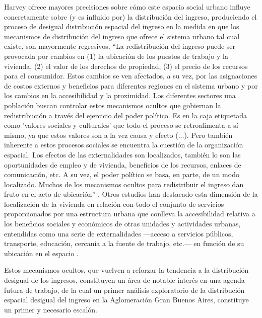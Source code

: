 Harvey ofrece mayores precisiones sobre cómo este espacio social urbano influye concretamente sobre (y es influido por) la distribución del ingreso, produciendo el proceso de desigual distribución espacial del ingreso en la medida en que los mecanismos de distribución del ingreso que ofrece el sistema urbano tal cual existe, son mayormente regresivos. “La redistribución del ingreso puede ser provocada por cambios en (1) la ubicación de los puestos de trabajo y la vivienda, (2) el valor de los derechos de propiedad, (3) el precio de los recursos para el consumidor. Estos cambios se ven afectados, a su vez, por las asignaciones de costos externos y beneficios para diferentes regiones en el sistema urbano y por los cambios en la accesibilidad y la proximidad. Los diferentes sectores una población buscan controlar estos mecanismos ocultos que gobiernan la redistribución a través del ejercicio del poder político. Es en la caja etiquetada como 'valores sociales y culturales' que todo el proceso se retroalimenta a sí mismo, ya que estos valores son a la vez causa y efecto (...). Pero también inherente a estos procesos sociales se encuentra la cuestión de la organización espacial. Los efectos de las externalidades son localizados, también lo son las oportunidades de empleo y de vivienda, beneficios de los recursos, enlaces de comunicación, etc. A su vez, el poder político se basa, en parte, de un modo localizado. Muchos de los mecanismos ocultos para redistribuir el ingreso dan fruto en el acto de ubicación” \cite[p.~86]{harvey}. Otros estudios han destacado esta dimensión de la localización de la vivienda en relación con todo el conjunto de servicios proporcionados por una estructura urbana que conlleva la accesibilidad relativa a los beneficios sociales y económicos de otras unidades y actividades urbanas, entendidas como una serie de externalidades —acceso a servicios públicos, transporte, educación, cercanía a la fuente de trabajo, etc.— en función de su ubicación en el espacio 	\cite{yujnovsky,oszlak}.

Estos mecanismos ocultos, que vuelven a reforzar la tendencia a la distribución desigual de los ingresos, constituyen un área de notable interés en una agenda futura de trabajo, de la cual un primer análisis exploratorio de la distribución espacial desigual del ingreso en la Aglomeración Gran Buenos Aires, constituye un primer y necesario escalón. 

